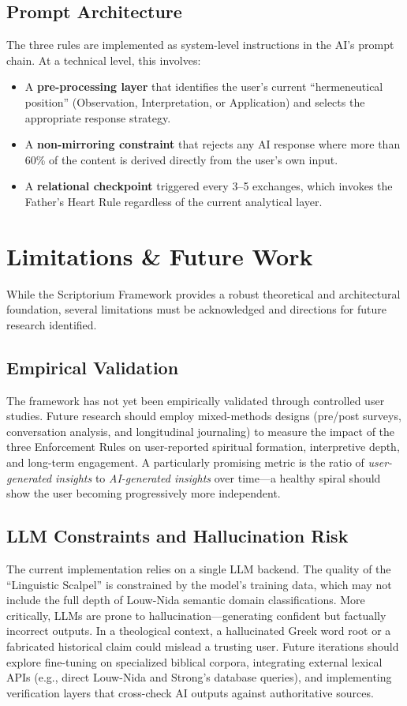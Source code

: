 \subsection{Prompt Architecture}
The three rules are implemented as system-level instructions in the AI's prompt chain. At a technical level, this involves:
\begin{itemize}
    \item A \textbf{pre-processing layer} that identifies the user's current ``hermeneutical position'' (Observation, Interpretation, or Application) and selects the appropriate response strategy.
    \item A \textbf{non-mirroring constraint} that rejects any AI response where more than 60\% of the content is derived directly from the user's own input.
    \item A \textbf{relational checkpoint} triggered every 3--5 exchanges, which invokes the Father's Heart Rule regardless of the current analytical layer.
\end{itemize}

\section{Limitations \& Future Work}
While the Scriptorium Framework provides a robust theoretical and architectural foundation, several limitations must be acknowledged and directions for future research identified.

\subsection{Empirical Validation}
The framework has not yet been empirically validated through controlled user studies. Future research should employ mixed-methods designs (pre/post surveys, conversation analysis, and longitudinal journaling) to measure the impact of the three Enforcement Rules on user-reported spiritual formation, interpretive depth, and long-term engagement. A particularly promising metric is the ratio of \textit{user-generated insights} to \textit{AI-generated insights} over time---a healthy spiral should show the user becoming progressively more independent.

\subsection{LLM Constraints and Hallucination Risk}
The current implementation relies on a single LLM backend. The quality of the ``Linguistic Scalpel'' is constrained by the model's training data, which may not include the full depth of Louw-Nida \cite{louwnida1988} semantic domain classifications. More critically, LLMs are prone to hallucination---generating confident but factually incorrect outputs. In a theological context, a hallucinated Greek word root or a fabricated historical claim could mislead a trusting user. Future iterations should explore fine-tuning on specialized biblical corpora, integrating external lexical APIs (e.g., direct Louw-Nida and Strong's \cite{strong1890} database queries), and implementing verification layers that cross-check AI outputs against authoritative sources.

